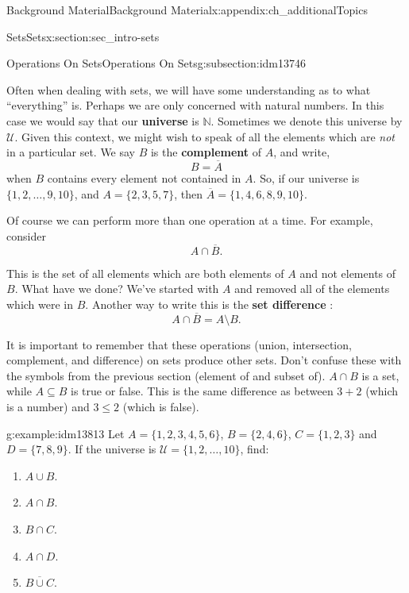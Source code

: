 \documentclass[oneside,10pt,]{book}
\newcommand{\terminology}[1]{\textbf{#1}}
\numberwithin{equation}{chapter}
\def\N{\mathbb N}
\def\U{\mathcal U}
\begin{document}
\begin{appendixptx}{Background Material}{}{Background Material}{}{}{x:appendix:ch_additionalTopics}
\begin{sectionptx}{Sets}{}{Sets}{}{}{x:section:sec_intro-sets}
\begin{subsectionptx}{Operations On Sets}{}{Operations On Sets}{}{}{g:subsection:idm13746}
\par
Often when dealing with sets, we will have some understanding as to what ``everything'' is. Perhaps we are only concerned with natural numbers. In this case we would say that our \terminology{universe} is \(\N\). Sometimes we denote this universe by \(\U\). Given this context, we might wish to speak of all the elements which are \emph{not} in a particular set. We say \(B\) is the \terminology{complement}  of \(A\), and write,%
\begin{equation*}
B = \overline A
\end{equation*}
when \(B\) contains every element not contained in \(A\). So, if our universe is \(\{1, 2,\ldots, 9, 10\}\), and \(A = \{2, 3, 5, 7\}\), then \(\overline A = \{1, 4, 6, 8, 9,10\}\).%
\par
Of course we can perform more than one operation at a time. For example, consider%
\begin{equation*}
A \cap \overline B.
\end{equation*}
%
\par
This is the set of all elements which are both elements of \(A\) and not elements of \(B\). What have we done? We've started with \(A\) and removed all of the elements which were in \(B\). Another way to write this is the \terminology{set difference}  :%
\begin{equation*}
A \cap \overline B = A \setminus B.
\end{equation*}
%
\par
It is important to remember that these operations (union, intersection, complement, and difference) on sets produce other sets. Don't confuse these with the symbols from the previous section (element of and subset of). \(A \cap B\) is a set, while \(A \subseteq B\) is true or false. This is the same difference as between \(3 + 2\) (which is a number) and \(3 \le 2\) (which is false).%
\begin{example}{}{g:example:idm13813}%
Let \(A = \{1, 2, 3, 4, 5, 6\}\), \(B = \{2, 4, 6\}\), \(C = \{1, 2, 3\}\) and \(D = \{7, 8, 9\}\). If the universe is \(\U = \{1, 2, \ldots, 10\}\), find:%
\begin{enumerate}
\item{}\(A \cup B\).%
\item{}\(A \cap B\).%
\item{}\(B \cap C\).%
\item{}\(A \cap D\).%
\item{}\(\overline{B \cup C}\).%

\end{enumerate}
\end{example}
\end{subsectionptx}
\end{sectionptx}
\end{appendixptx}
\end{document}
